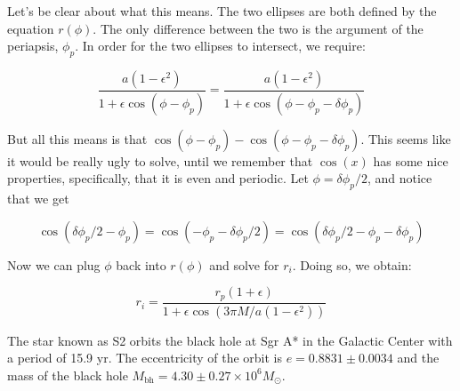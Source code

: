 \documentclass[11pt,largemargins]{homework}
\begin{document}
\begin{alphaparts}
Let's be clear about what this means. The two ellipses are both defined by the equation $r(\phi)$.  The only difference between the two is the argument of the periapsis, $\phi_{p}$.  In order for the two ellipses to intersect, we require:

\begin{equation}
\frac{a(1 - \epsilon^2)}{1 + \epsilon \cos(\phi - \phi_{p})} = \frac{a(1 - \epsilon^2)}{1+\epsilon \cos(\phi - \phi_{p} - \delta \phi_{p})}
\end{equation}

But all this means is that $\cos(\phi - \phi_{p}) - \cos(\phi - \phi_{p} - \delta \phi_{p})$. This seems like it would be really ugly to solve, until we remember that $\cos(x)$ has some nice properties, specifically, that it is even and periodic.  Let $\phi = \delta \phi_{p} / 2$, and notice that we get

$$
\cos{(\delta \phi_{p}/2 - \phi_{p})} = \cos(-\phi_{p} - \delta \phi_{p} / 2) = \cos(\delta \phi_{p} / 2 - \phi_{p} - \delta \phi_{p}) 
$$

Now we can plug $\phi$ back into $r(\phi)$ and solve for $r_{i}$.  Doing so, we obtain:

\begin{equation}
r_{i} = \frac{r_{p} (1 + \epsilon)}{1 + \epsilon \cos(3 \pi M/ a(1 - \epsilon^2))}
\end{equation}
\end{alphaparts}

\question
The star known as S2 orbits the black hole at Sgr A* in the Galactic Center with a period of 15.9 yr.  The eccentricity of the orbit is $e = 0.8831 \pm 0.0034$ and the mass of the black hole $M_{\mathrm{bh}} = 4.30 \pm 0.27 \times 10^{6} M_{\odot}$.
\end{document}
